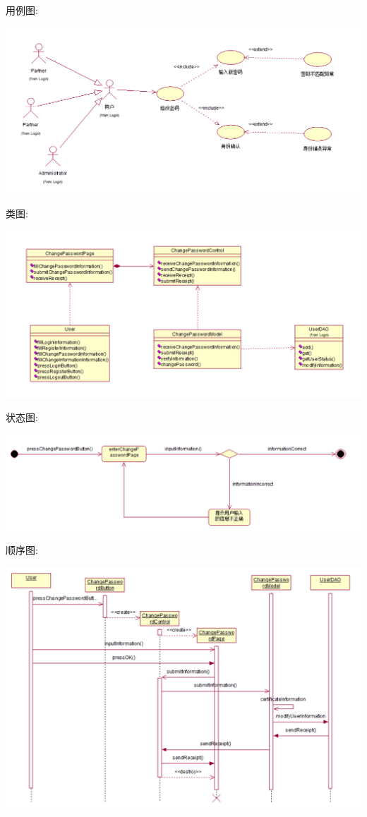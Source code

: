 \documentclass[11pt]{article}
\begin{document}
			用例图: 
			\begin{center}
			\includegraphics[scale=0.42]{修改密码_用例图.png}
			\end{center}

			类图: 
			\begin{center}
			\includegraphics[scale=0.42]{修改密码_类图.png}
			\end{center}

			状态图: 
			\begin{center}
			\includegraphics[scale=0.42]{修改密码_状态图.png}
			\end{center}

			顺序图: 
			\begin{center}
			\includegraphics[scale=0.42]{修改密码_顺序图.png}
			\end{center}
\end{document}
